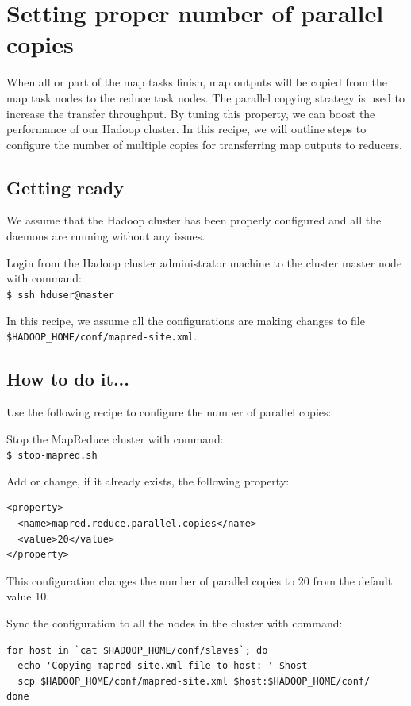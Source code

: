 \section{Setting proper number of parallel copies}
When all or part of the map tasks finish, map outputs will be copied from the map task nodes to the reduce task nodes. The parallel copying strategy is used to increase the transfer throughput. By tuning this property, we can boost the performance of our Hadoop cluster. In this recipe, we will outline steps to configure the number of multiple copies for transferring map outputs to reducers.
\subsection*{Getting ready}
We assume that the Hadoop cluster has been properly configured and all the daemons are running without any issues.

Login from the Hadoop cluster administrator machine to the cluster master node with command: \\
\verb|$ ssh hduser@master|

In this recipe, we assume all the configurations are making changes to file \verb|$HADOOP_HOME/conf/mapred-site.xml|.
\subsection*{How to do it...}
Use the following recipe to configure the number of parallel copies:

Stop the MapReduce cluster with command: \\
\verb|$ stop-mapred.sh|

Add or change, if it already exists, the following property:
\lstset{style=bashstyle}
\begin{lstlisting}
<property>
  <name>mapred.reduce.parallel.copies</name>
  <value>20</value>
</property>
\end{lstlisting}

This configuration changes the number of parallel copies to 20 from the default value 10.

Sync the configuration to all the nodes in the cluster with command:
\lstset{style=bashstyle}
\begin{lstlisting}
for host in `cat $HADOOP_HOME/conf/slaves`; do
  echo 'Copying mapred-site.xml file to host: ' $host
  scp $HADOOP_HOME/conf/mapred-site.xml $host:$HADOOP_HOME/conf/
done
\end{lstlisting}

